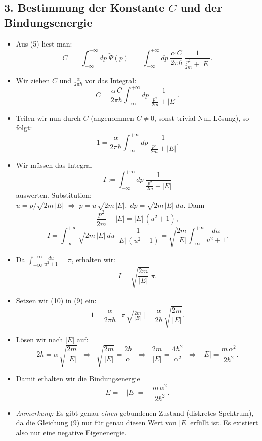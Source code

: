 \documentclass[12pt,a4paper]{scrartcl}
\begin{document}
\subsection*{3. Bestimmung der Konstante $C$ und der Bindungsenergie}

\begin{itemize}
  \item Aus (5) liest man:
  \[
    C \;=\; \int_{-\infty}^{+\infty} dp\;\widetilde\Psi(p) 
    \;=\; \int_{-\infty}^{+\infty} dp\;
    \frac{\alpha\,C}{2\pi\hbar}\,\frac{1}{\frac{p^2}{2m} + |E|}.
  \]
  \item Wir ziehen $C$ und $\frac{\alpha}{2\pi\hbar}$ vor das Integral:
  \[
    C = \frac{\alpha\,C}{2\pi\hbar} \int_{-\infty}^{+\infty} dp\;\frac{1}{\frac{p^2}{2m} + |E|}.
    \tag{8}
  \]
  \item Teilen wir nun durch $C$ (angenommen $C\neq 0$, sonst trivial Null-Lösung), so folgt:
  \[
    1 = \frac{\alpha}{2\pi\hbar} \int_{-\infty}^{+\infty} dp\;\frac{1}{\frac{p^2}{2m} + |E|}.
    \tag{9}
  \]
  \item Wir müssen das Integral 
  \[
    I := \int_{-\infty}^{+\infty} dp\;\frac{1}{\frac{p^2}{2m} + |E|}
  \]
  auswerten. Substitution: $u = p/\sqrt{2m\,|E|}\;\Rightarrow\; p = u\,\sqrt{2m\,|E|},\; dp = \sqrt{2m\,|E|}\,du$. Dann
  \[
    \frac{p^2}{2m} + |E| 
    = |E|\,(u^2 + 1),
  \]
  \[
    I = \int_{-\infty}^{+\infty} \sqrt{2m\,|E|}\,du \;\frac{1}{|E|\,(u^2 + 1)}
    = \sqrt{\frac{2m}{|E|}} \int_{-\infty}^{+\infty} \frac{du}{u^2 + 1}.
  \]
  \item Da $\int_{-\infty}^{+\infty} \frac{du}{u^2 + 1} = \pi$, erhalten wir:
  \[
    I = \sqrt{\frac{2m}{|E|}} \;\pi.
    \tag{10}
  \]
  \item Setzen wir (10) in (9) ein:
  \[
    1 = \frac{\alpha}{2\pi\hbar} \;\bigl[\,\pi\,\sqrt{\tfrac{2m}{|E|}}\,\bigr] 
    = \frac{\alpha}{2\hbar}\,\sqrt{\frac{2m}{|E|}}.
  \]
  \item Lösen wir nach $|E|$ auf:
  \[
    2\hbar = \alpha\,\sqrt{\frac{2m}{|E|}}
    \;\;\Longrightarrow\;\;
    \sqrt{\frac{2m}{|E|}} = \frac{2\hbar}{\alpha}
    \;\;\Longrightarrow\;\;
    \frac{2m}{|E|} = \frac{4\hbar^2}{\alpha^2}
    \;\;\Longrightarrow\;\;
    |E| = \frac{m\,\alpha^2}{2\hbar^2}.
  \]
  \item Damit erhalten wir die Bindungsenergie 
  \[
    E = -\,|E| 
    = -\,\frac{m\,\alpha^2}{2\hbar^2}.
    \tag{11}
  \]
  \item \emph{Anmerkung:} Es gibt genau \emph{einen} gebundenen Zustand (diskretes Spektrum), da die Gleichung (9) nur für genau diesen Wert von $|E|$ erfüllt ist. Es existiert also nur eine negative Eigenenergie.
\end{itemize}
\end{document}

